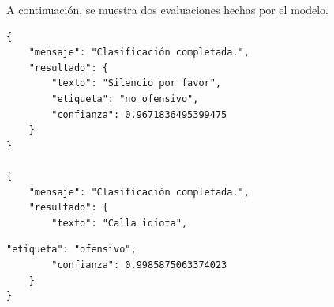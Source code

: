 A continuación, se muestra dos evaluaciones hechas por el modelo.

\begin{lstlisting}[style=jsoncode]
{
    "mensaje": "Clasificación completada.",
    "resultado": {
        "texto": "Silencio por favor",
        "etiqueta": "no_ofensivo",
        "confianza": 0.9671836495399475
    }
}

{
    "mensaje": "Clasificación completada.",
    "resultado": {
        "texto": "Calla idiota",
\end{lstlisting}


\vspace{0.5cm}

\begin{lstlisting}[style=jsoncode]
        "etiqueta": "ofensivo",
        "confianza": 0.9985875063374023
    }
}
\end{lstlisting}



